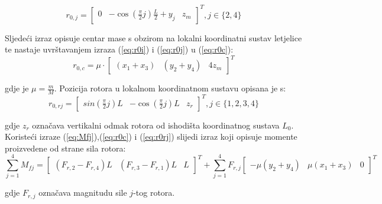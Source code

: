 \documentclass[11pt,a4paper]{article}
\begin{document}
\begin{equation}
r_{0,j} = \left[
\begin{matrix}
0 & -\cos\left(\frac{\pi}{2}j\right)\frac{L}{2} + y_{j} & z_{m}
\end{matrix} \right] ^{T}, j \in \{ 2, 4\}
\label{eq:r0j}
\end{equation}

 
Sljedeći izraz opisuje centar mase s obzirom na lokalni koordinatni sustav letjelice te nastaje uvrštavanjem izraza (\ref{eq:r0i}) i (\ref{eq:r0j}) u (\ref{eq:r0c}):
\begin{equation}
r_{0,c} = \mu \cdot \left[
\begin{matrix}
(x_{1} + x_{3}) & (y_{2} + y_{4}) & 4z_{m}
\end{matrix} \right]^{T}
\label{eq:r0c}
\end{equation}

gdje je $\mu = \frac{m}{M}$. Pozicija rotora u lokalnom koordinatnom sustavu opisana je s:
\begin{equation}
r_{0,rj} = \left[
\begin{matrix}
sin\left(\frac{\pi}{2}j\right)L & -\cos\left(\frac{\pi}{2}j\right)L & z_{r}
\end{matrix} \right] ^{T}, j \in \{ 1, 2, 3, 4\}
\label{eq:r0rj}
\end{equation}

gdje $z_{r}$ označava vertikalni odmak rotora od ishodišta koordinatnog sustava $L_{0}$. Koristeći izraze (\ref{eq:Mfj}),(\ref{eq:r0c}) i (\ref{eq:r0rj}) slijedi izraz koji opisuje momente proizvedene od strane sila rotora:
\begin{equation}
\sum_{j=1}^{4}M_{fj} = \left[
\begin{matrix}
(F_{r,2} - F_{r,4})L & (F_{r,3} - F_{r,1})L & L
\end{matrix}\right]^{T} + \sum_{j=1}^{4}F_{r,j} 
\left[\begin{matrix}
-\mu(y_{2} + y_{4}) & \mu(x_{1} + x_{3}) & 0
\end{matrix}\right]^{T}
\label{eq:sumaMfj}
\end{equation}

gdje $F_{r,j}$ označava magnitudu sile $j$-tog rotora. 

\medskip
\end{document}
